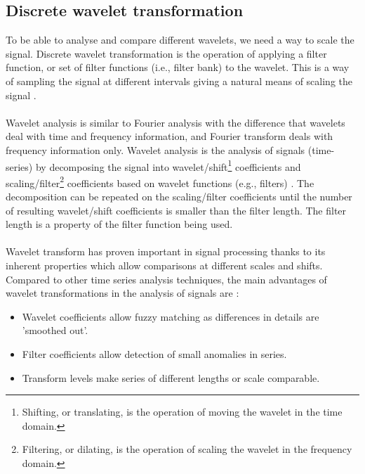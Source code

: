 \subsection{Discrete wavelet transformation}
To be able to analyse and compare different wavelets, we need a way to scale
the signal. Discrete wavelet transformation is the operation of applying a
filter function, or set of filter functions (i.e., filter bank) to the wavelet.
This is a way of sampling the signal at different intervals giving a natural
means of scaling the signal \cite{karus2013}.

\paragraph{}
Wavelet analysis is similar to Fourier analysis with the difference that
wavelets deal with time and frequency information, and Fourier transform deals
with frequency information only. Wavelet analysis is the analysis of signals
(time-series) by decomposing the signal into wavelet/shift\footnote{Shifting,
or translating, is the operation of moving the wavelet in the time domain.}
coefficients and scaling/filter\footnote{Filtering, or dilating, is the
operation of scaling the wavelet in the frequency domain.} coefficients based
on wavelet functions (e.g., filters) \cite{karus2013}. The decomposition can be
repeated on the scaling/filter coefficients until the number of resulting
wavelet/shift coefficients is smaller than the filter length. The filter length
is a property of the filter function being used.

\paragraph{}
Wavelet transform has proven important in signal processing thanks to its
inherent properties which allow comparisons at different scales and shifts.
Compared to other time series analysis techniques, the main advantages of
wavelet transformations in the analysis of signals are \cite{karus2013}:
\begin{itemize}
	\item Wavelet coefficients allow fuzzy matching as differences in details are
	'smoothed out'.
	\item Filter coefficients allow detection of small anomalies in series.
	\item Transform levels make series of different lengths or scale comparable.
\end{itemize}

